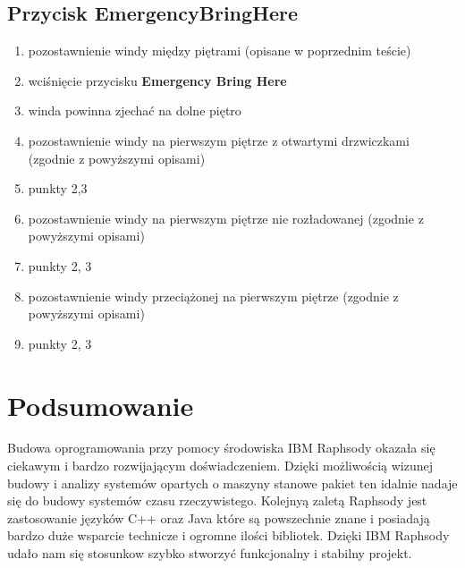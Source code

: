 \documentclass[a4paper,11pt]{article}
\begin{document}
	\subsection{Przycisk EmergencyBringHere}
		\begin{enumerate}
			\item pozostawnienie windy między piętrami (opisane w poprzednim teście)
			\item wciśnięcie przycisku \textbf{Emergency Bring Here}
			\item winda powinna zjechać na dolne piętro
			\item pozostawnienie windy na pierwszym piętrze z otwartymi drzwiczkami (zgodnie z powyższymi opisami)
			\item punkty 2,3
			\item pozostawnienie windy na pierwszym piętrze nie rozładowanej (zgodnie z powyższymi opisami)
			\item punkty 2, 3
			\item pozostawnienie windy przeciążonej na pierwszym piętrze (zgodnie z powyższymi opisami)
			\item punkty 2, 3
		\end{enumerate}


		
	
\section{Podsumowanie}
	Budowa oprogramowania przy pomocy środowiska IBM Raphsody 
	okazała się ciekawym i bardzo rozwijającym doświadczeniem.
	Dzięki możliwością wizunej budowy i analizy systemów opartych o maszyny stanowe pakiet ten idalnie 
	nadaje się do budowy systemów czasu rzeczywistego. Kolejnyą zaletą Raphsody jest zastosowanie 
	języków C++ oraz Java które są powszechnie znane i posiadają bardzo 
	duże wsparcie technicze i ogromne ilości bibliotek.
	Dzięki IBM Raphsody udało nam się stosunkow szybko stworzyć funkcjonalny i stabilny projekt.
\end{document}
